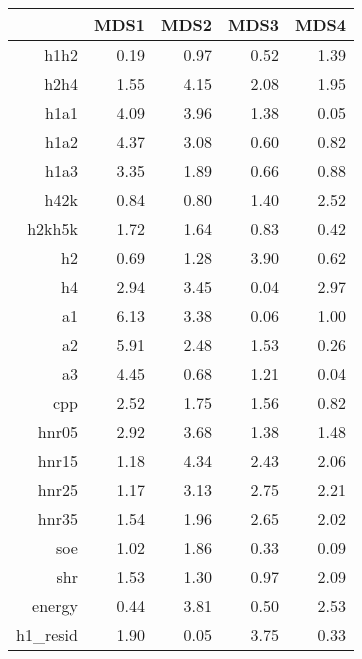 \begin{table}[ht]
\centering
\begin{tabular}{rrrrr}
  \hline
 & MDS1 & MDS2 & MDS3 & MDS4 \\ 
  \hline
h1h2 & 0.19 & 0.97 & 0.52 & 1.39 \\ 
  h2h4 & 1.55 & 4.15 & 2.08 & 1.95 \\ 
  h1a1 & 4.09 & 3.96 & 1.38 & 0.05 \\ 
  h1a2 & 4.37 & 3.08 & 0.60 & 0.82 \\ 
  h1a3 & 3.35 & 1.89 & 0.66 & 0.88 \\ 
  h42k & 0.84 & 0.80 & 1.40 & 2.52 \\ 
  h2kh5k & 1.72 & 1.64 & 0.83 & 0.42 \\ 
  h2 & 0.69 & 1.28 & 3.90 & 0.62 \\ 
  h4 & 2.94 & 3.45 & 0.04 & 2.97 \\ 
  a1 & 6.13 & 3.38 & 0.06 & 1.00 \\ 
  a2 & 5.91 & 2.48 & 1.53 & 0.26 \\ 
  a3 & 4.45 & 0.68 & 1.21 & 0.04 \\ 
  cpp & 2.52 & 1.75 & 1.56 & 0.82 \\ 
  hnr05 & 2.92 & 3.68 & 1.38 & 1.48 \\ 
  hnr15 & 1.18 & 4.34 & 2.43 & 2.06 \\ 
  hnr25 & 1.17 & 3.13 & 2.75 & 2.21 \\ 
  hnr35 & 1.54 & 1.96 & 2.65 & 2.02 \\ 
  soe & 1.02 & 1.86 & 0.33 & 0.09 \\ 
  shr & 1.53 & 1.30 & 0.97 & 2.09 \\ 
  energy & 0.44 & 3.81 & 0.50 & 2.53 \\ 
  h1\_resid & 1.90 & 0.05 & 3.75 & 0.33 \\ 
   \hline
\end{tabular}
\end{table}

